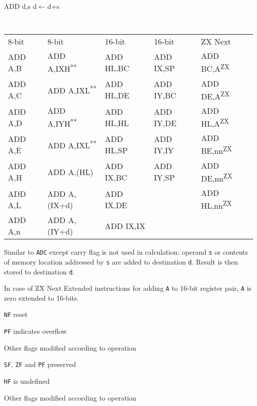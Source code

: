 \documentclass[twoside,openright,a4paper]{book}
\newcommand{\UNDOC}{\textnormal{\textsuperscript{**}}}
\newcommand{\ZXN}{\textnormal{\textsuperscript{ZX}}}
\begin{document}
\begin{basedescript}{
	\desclabelstyle{\multilinelabel}
	\desclabelwidth{3cm}}
	\pagebreak
	\begin{detailitem}{ADD d,s}
		{d$\leftarrow$d+s}

		{
			\tt
			\begin{tabularx}{0.8\textwidth}{@{}p{1.5cm}Xp{2cm}p{2cm}p{2.2cm}}
				\textnormal{8-bit} & \textnormal{8-bit} & \textnormal{16-bit} & \textnormal{16-bit} & \textnormal{ZX Next} \\
				ADD A,B & 
					ADD A,IXH\UNDOC & 
					ADD HL,BC & 
					ADD IX,SP & 
					ADD BC,A\ZXN \\
				ADD A,C & 
					ADD A,IXL\UNDOC & 
					ADD HL,DE & 
					ADD IY,BC & 
					ADD DE,A\ZXN \\
				ADD A,D & 
					ADD A,IYH\UNDOC & 
					ADD HL,HL & 
					ADD IY,DE & 
					ADD HL,A\ZXN \\
				ADD A,E & 
					ADD A,IXL\UNDOC & 
					ADD HL,SP & 
					ADD IY,IY & 
					ADD BE,nn\ZXN \\ 
				ADD A,H & 
					ADD A,(HL) & 
					ADD IX,BC & 
					ADD IY,SP & 
					ADD DE,nn\ZXN \\
				ADD A,L & 
					ADD A,(IX+d) & 
					ADD IX,DE & 
					& 
					ADD HL,nn\ZXN \\
				ADD A,n & 
					ADD A,(IY+d) & 
					ADD IX,IX & \\
			\end{tabularx}
		}
		
		Similar to {\tt ADC} except carry flag is not used in calculation: operand {\tt s} or contents of memory location addressed by {\tt s} are added to destination {\tt d}. Result is then stored to destination {\tt d}.

		In case of ZX Next Extended instructions for adding {\tt A} to 16-bit register pair, {\tt A} is zero extended to 16-bits.

		\DetailEffectsTitle
		\begin{multicols}{2}
			\begin{DetailEffectsNoTitle}[8-bit]
				\item {\tt NF} reset
				\item {\tt PF} indicates overflow
				\item Other flags modified according to operation
			\end{DetailEffectsNoTitle}

			\begin{DetailEffectsNoTitle}[16-bit]
				\item {\tt SF}, {\tt ZF} and {\tt PF} preserved
				\item {\tt HF} is undefined
				\item Other flags modified according to operation
			\end{DetailEffectsNoTitle}
		\end{multicols}


\end{detailitem}
\end{basedescript}
\end{document}
